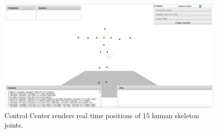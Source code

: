 \begin{figure}
	[h] \centering 
	\includegraphics[width=145mm]{figures/content/cc-skeleton.jpg} 
	\caption{Control Center renders real time positions of 15 human skeleton joints.} 
	\label{fg:cc:skeleton} 
\end{figure}